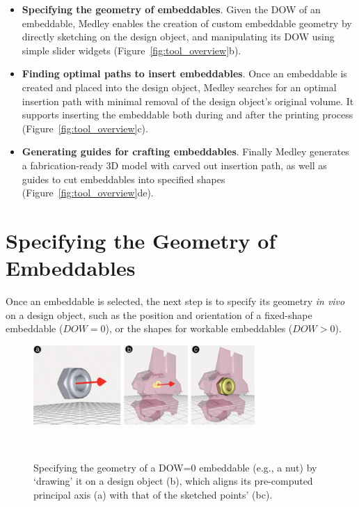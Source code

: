 \begin{itemize}
	\item \textbf{Specifying the geometry of embeddables}. Given the DOW of an embeddable, Medley enables the creation of custom embeddable geometry by directly sketching on the design object, and manipulating its DOW using simple slider widgets (Figure~\ref{fig:tool_overview}b).
	\item \textbf{Finding optimal paths to insert embeddables}. Once an embeddable is created and placed into the design object, Medley searches for an optimal insertion path with minimal removal of the design object's original volume. It supports inserting the embeddable both during and after the printing process (Figure~\ref{fig:tool_overview}c).
	\item \textbf{Generating guides for crafting embeddables}. Finally Medley generates a fabrication-ready 3D model with carved out insertion path, as well as guides to cut embeddables into specified shapes (Figure~\ref{fig:tool_overview}de).
\end{itemize}



\section{Specifying the Geometry of Embeddables}
Once an embeddable is selected, the next step is to specify its geometry \textit{in vivo} on a design object, such as the position and orientation of a fixed-shape embeddable ($DOW=0$), or the shapes for workable embeddables ($DOW>0$).

\begin{figure} [t]
  \centering
  \includegraphics[width=0.75\textwidth]{figures/spec_dow0}
  \caption{Specifying the geometry of a DOW=0 embeddable (e.g., a nut) by `drawing' it on a design object (b), which aligns its pre-computed principal axis (a) with that of the sketched points' (bc).}~\label{fig:spec_dow0}
\end{figure}

